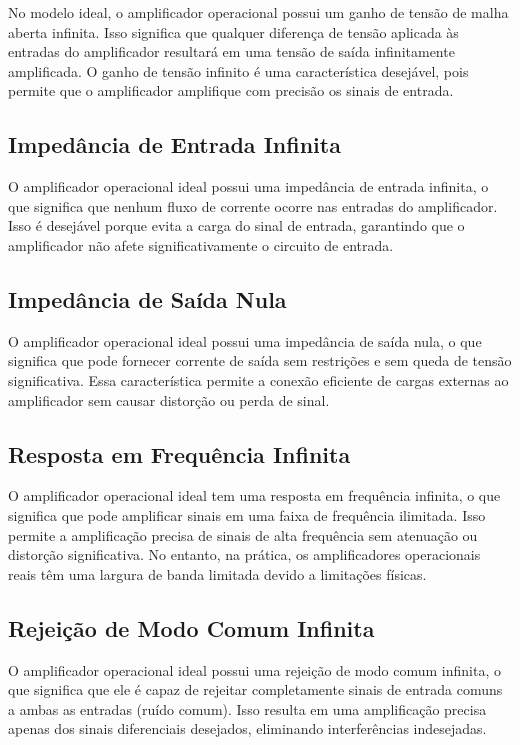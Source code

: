 \documentclass[12pt,twoside, a4paper, twocolumn]{article}
\begin{document}
No modelo ideal, o amplificador operacional possui um ganho de tensão de malha aberta infinita. Isso significa que qualquer diferença de tensão aplicada às entradas do amplificador resultará em uma tensão de saída infinitamente amplificada. O ganho de tensão infinito é uma característica desejável, pois permite que o amplificador amplifique com precisão os sinais de entrada.


\subsection{Impedância de Entrada Infinita}


O amplificador operacional ideal possui uma impedância de entrada infinita, o que significa que nenhum fluxo de corrente ocorre nas entradas do amplificador. Isso é desejável porque evita a carga do sinal de entrada, garantindo que o amplificador não afete significativamente o circuito de entrada.


\subsection{Impedância de Saída Nula}


O amplificador operacional ideal possui uma impedância de saída nula, o que significa que pode fornecer corrente de saída sem restrições e sem queda de tensão significativa. Essa característica permite a conexão eficiente de cargas externas ao amplificador sem causar distorção ou perda de sinal.


\subsection{Resposta em Frequência Infinita}


O amplificador operacional ideal tem uma resposta em frequência infinita, o que significa que pode amplificar sinais em uma faixa de frequência ilimitada. Isso permite a amplificação precisa de sinais de alta frequência sem atenuação ou distorção significativa. No entanto, na prática, os amplificadores operacionais reais têm uma largura de banda limitada devido a limitações físicas.


\subsection{Rejeição de Modo Comum Infinita}


O amplificador operacional ideal possui uma rejeição de modo comum infinita, o que significa que ele é capaz de rejeitar completamente sinais de entrada comuns a ambas as entradas (ruído comum). Isso resulta em uma amplificação precisa apenas dos sinais diferenciais desejados, eliminando interferências indesejadas.
\end{document}
